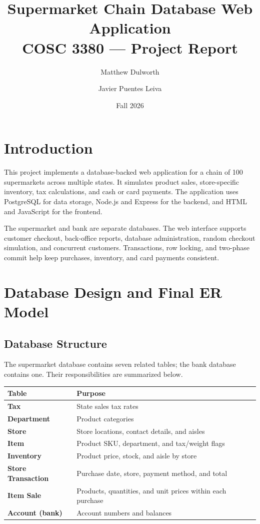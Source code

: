 \documentclass[11pt,letterpaper]{article}
\title{Supermarket Chain Database Web Application\\COSC 3380 --- Project Report}
\author{Matthew Dulworth \and Javier Puentes Leiva}
\date{Fall 2026}
\begin{document}
\maketitle

\section{Introduction}

This project implements a database-backed web application for a chain of 100 supermarkets across multiple states. It simulates product sales, store-specific inventory, tax calculations, and cash or card payments. The application uses PostgreSQL for data storage, Node.js and Express for the backend, and HTML and JavaScript for the frontend.

The supermarket and bank are separate databases. The web interface supports customer checkout, back-office reports, database administration, random checkout simulation, and concurrent customers. Transactions, row locking, and two-phase commit help keep purchases, inventory, and card payments consistent.

\section{Database Design and Final ER Model}

\subsection{Database Structure}

The supermarket database contains seven related tables; the bank database contains one. Their responsibilities are summarized below.

\begin{center}
\small
\begin{tabularx}{\textwidth}{@{}>{\bfseries}p{}X@{}}
\hline
Table & Purpose \\ \hline
Tax & State sales tax rates \\
Department & Product categories \\
Store & Store locations, contact details, and aisles \\
Item & Product SKU, department, and tax/weight flags \\
Inventory & Product price, stock, and aisle by store \\
Store Transaction & Purchase date, store, payment method, and total \\
Item Sale & Products, quantities, and unit prices within each purchase \\
Account (bank) & Account numbers and balances \\ \hline
\end{tabularx}
\end{center}
\end{document}
